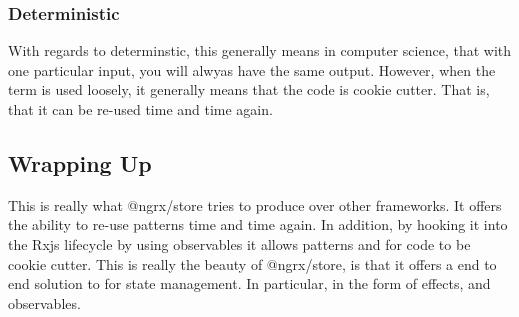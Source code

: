 \subsubsection{Deterministic}
With regards to determinstic, this generally means in computer science, that
with one particular input, you will alwyas have the same output. However, when
the term is used loosely, it generally means that the code is cookie cutter.
That is, that it can be re-used time and time again.

\subsection{Wrapping Up}
This is really what @ngrx/store tries to produce over other frameworks. It
offers the ability to re-use patterns time and time again. In addition, by
hooking it into the Rxjs lifecycle by using observables it allows patterns and
for code to be cookie cutter. This is really the beauty of @ngrx/store, is that
it offers a end to end solution to for state management. In particular, in the
form of effects, and observables.
